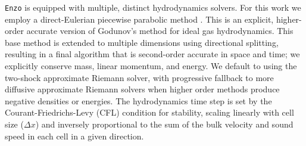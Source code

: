 \documentclass[11pt]{article}
\begin{document}
\texttt{Enzo} is equipped with multiple, distinct hydrodynamics solvers. For this work we employ a direct-Eulerian piecewise parabolic method \citep{ColellaWoodward1984, Bryan1995}. This is an explicit, higher-order accurate version of Godunov's method for ideal gas hydrodynamics. This base method is extended to multiple dimensions using directional splitting, resulting in a final algorithm that is second-order accurate in space and time; we explicitly conserve mass, linear momentum, and energy. We default to using the two-shock approximate Riemann solver, with progressive fallback to more diffusive approximate Riemann solvers when higher order methods produce negative densities or energies. The hydrodynamics time step is set by the Courant-Friedrichs-Levy (CFL) condition for stability, scaling linearly with cell size ($\Delta x$) and inversely proportional to the sum of the bulk velocity and sound speed in each cell in a given direction. 

\end{document}
